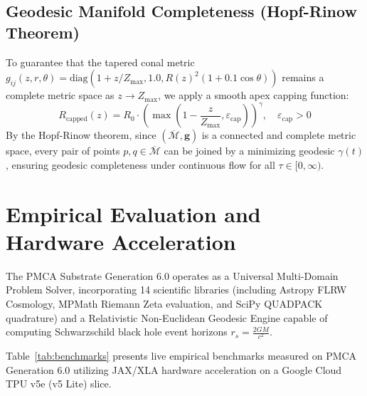 \documentclass[12pt, a4paper]{article}
\begin{document}
\subsection{Geodesic Manifold Completeness (Hopf-Rinow Theorem)}
To guarantee that the tapered conal metric $g_{ij}(z, r, \theta) = \text{diag}(1 + z/Z_{\max}, 1.0, R(z)^2(1 + 0.1\cos\theta))$ remains a complete metric space as $z \to Z_{\max}$, we apply a smooth apex capping function:
\begin{equation}
R_{\text{capped}}(z) = R_0 \cdot \left( \max\left( 1 - \frac{z}{Z_{\max}}, \varepsilon_{\text{cap}} \right) \right)^\gamma, \quad \varepsilon_{\text{cap}} > 0
\end{equation}
By the Hopf-Rinow theorem, since $(\overline{\mathcal{M}}, \mathbf{g})$ is a connected and complete metric space, every pair of points $p, q \in \overline{\mathcal{M}}$ can be joined by a minimizing geodesic $\gamma(t)$, ensuring geodesic completeness under continuous flow for all $\tau \in [0, \infty)$.

\section{Empirical Evaluation and Hardware Acceleration}

The PMCA Substrate Generation 6.0 operates as a Universal Multi-Domain Problem Solver, incorporating 14 scientific libraries (including Astropy FLRW Cosmology, MPMath Riemann Zeta evaluation, and SciPy QUADPACK quadrature) and a Relativistic Non-Euclidean Geodesic Engine capable of computing Schwarzschild black hole event horizons $r_s = \frac{2GM}{c^2}$.

Table~\ref{tab:benchmarks} presents live empirical benchmarks measured on PMCA Generation 6.0 utilizing JAX/XLA hardware acceleration on a Google Cloud TPU v5e (v5 Lite) slice.
\end{document}
